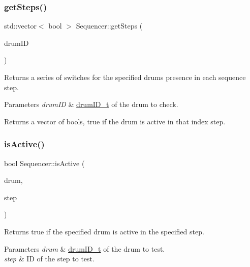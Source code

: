 \subsubsection{\texorpdfstring{get\+Steps()}{getSteps()}}
{\footnotesize\ttfamily std\+::vector$<$ bool $>$ Sequencer\+::get\+Steps (\begin{DoxyParamCaption}\item[{\hyperlink{namespacedrumpi_a3897274035c1b939a604438abe648b1b}{drum\+I\+D\+\_\+t}}]{drum\+ID }\end{DoxyParamCaption})}

Returns a series of switches for the specified drum\textquotesingle{}s presence in each sequence step. 
\begin{DoxyParams}{Parameters}
{\em drum\+ID} & \hyperlink{namespacedrumpi_a3897274035c1b939a604438abe648b1b}{drum\+I\+D\+\_\+t} of the drum to check. \\
\hline
\end{DoxyParams}
\begin{DoxyReturn}{Returns}
a vector of {\ttfamily bool}s, {\ttfamily true} if the drum is active in that index\textquotesingle{} step. 
\end{DoxyReturn}
\mbox{\label{classdrumpi_1_1Sequencer_a9125b926864c998496a662b1fd8cd535}} 
\subsubsection{\texorpdfstring{is\+Active()}{isActive()}\hspace{0.1cm}{\footnotesize\ttfamily [1/2]}}
{\footnotesize\ttfamily bool Sequencer\+::is\+Active (\begin{DoxyParamCaption}\item[{\hyperlink{namespacedrumpi_a3897274035c1b939a604438abe648b1b}{drum\+I\+D\+\_\+t}}]{drum,  }\item[{int}]{step }\end{DoxyParamCaption})}

Returns {\ttfamily true} if the specified drum is active in the specified step. 
\begin{DoxyParams}{Parameters}
{\em drum} & \hyperlink{namespacedrumpi_a3897274035c1b939a604438abe648b1b}{drum\+I\+D\+\_\+t} of the drum to test. \\
\hline
{\em step} & ID of the step to test. \\
\hline
\end{DoxyParams}
\mbox{\label{classdrumpi_1_1Sequencer_a7af390c7241b0fc7ccdf17cd6f14171f}} 
